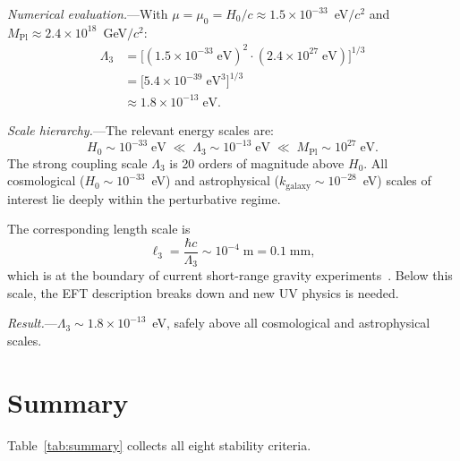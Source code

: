 \documentclass[prd,twocolumn,superscriptaddress,longbibliography,floatfix]{revtex4-2}
\newcommand{\MPl}{M_{\mathrm{Pl}}}
\begin{document}
\textit{Numerical evaluation.}---With $\mu = \mu_0 = H_0/c
\approx 1.5 \times 10^{-33}$~eV$/c^2$ and
$\MPl \approx 2.4 \times 10^{18}$~GeV$/c^2$:
\begin{align}
\Lambda_3 &= \big[(1.5 \times 10^{-33}\;\mathrm{eV})^2
\cdot (2.4 \times 10^{27}\;\mathrm{eV})\big]^{1/3}
\nonumber\\
&= \big[5.4 \times 10^{-39}\;\mathrm{eV}^3\big]^{1/3}
\nonumber\\
&\approx 1.8 \times 10^{-13}\;\mathrm{eV}.
\label{eq:Lambda3_value}
\end{align}

\textit{Scale hierarchy.}---The relevant energy scales are:
\begin{equation}
H_0 \sim 10^{-33}\;\mathrm{eV}
\;\ll\;
\Lambda_3 \sim 10^{-13}\;\mathrm{eV}
\;\ll\;
\MPl \sim 10^{27}\;\mathrm{eV}.
\label{eq:hierarchy}
\end{equation}
The strong coupling scale $\Lambda_3$ is 20 orders of magnitude
above $H_0$.  All cosmological ($H_0 \sim 10^{-33}$~eV) and
astrophysical ($k_{\mathrm{galaxy}} \sim 10^{-28}$~eV) scales
of interest lie deeply within the perturbative regime.

The corresponding length scale is
\begin{equation}
\ell_3 = \frac{\hbar c}{\Lambda_3} \sim 10^{-4}\;\mathrm{m}
= 0.1\;\mathrm{mm},
\label{eq:ell3}
\end{equation}
which is at the boundary of current short-range gravity
experiments~\cite{Adelberger2003}.  Below this scale,
the EFT description breaks down and new UV physics is
needed.

\textit{Result.}---$\Lambda_3 \sim 1.8 \times 10^{-13}$~eV,
safely above all cosmological and astrophysical scales.  \checkmark


\section{Summary}
\label{sec:summary}

Table~\ref{tab:summary} collects all eight stability criteria.
\end{document}

